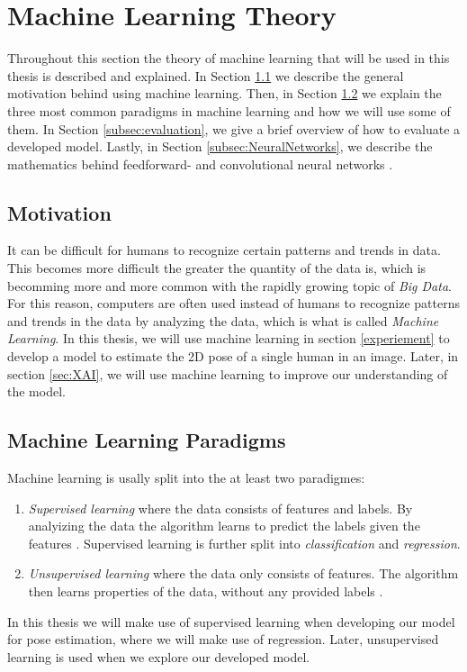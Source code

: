 \documentclass[./main.tex]{subfiles}
\begin{document}
\section{Machine Learning Theory}\label{sec:theory}
Throughout this section the theory of machine learning that will be used in this thesis is described and explained. In Section \ref{subsec:motivation_theory} we describe the general motivation behind using machine learning. Then, in Section \ref{subsec:ml_paradigmes} we explain the three most common paradigms in machine learning and how we will use some of them. In Section \ref{subsec:evaluation}, we give a brief overview of how to evaluate a developed model. Lastly, in Section \ref{subsec:NeuralNetworks}, we describe the mathematics behind feedforward- and convolutional neural networks .

\subsection{Motivation}\label{subsec:motivation_theory}
It can be difficult for humans to recognize certain patterns and trends in data. This becomes more difficult the greater the quantity of the data is, which is becomming more and more common with the rapidly growing topic of \textit{Big Data}. For this reason, computers are often used instead of humans to recognize patterns and trends in the data by analyzing the data, which is what is called \textit{Machine Learning}. In this thesis, we will use machine learning in section \ref{experiement} to develop a model to estimate the 2D pose of a single human in an image. Later, in section \ref{sec:XAI}, we will use machine learning to improve our understanding of the model.

\subsection{Machine Learning Paradigms}\label{subsec:ml_paradigmes}
Machine learning is usally split into the at least two paradigmes:
\begin{enumerate}
    \item \textit{Supervised learning} where the data consists of features and labels. By analyizing the data the algorithm learns to predict the labels given the features \cite{ESL}. Supervised learning is further split into \textit{classification} and \textit{regression}.
    \item \textit{Unsupervised learning} where the data only consists of features. The algorithm then learns properties of the data, without any provided labels \cite{ESL}.
\end{enumerate}
In this thesis we will make use of supervised learning when developing our model for pose estimation, where we will make use of regression. Later, unsupervised learning is used when we explore our developed model.
\end{document}
